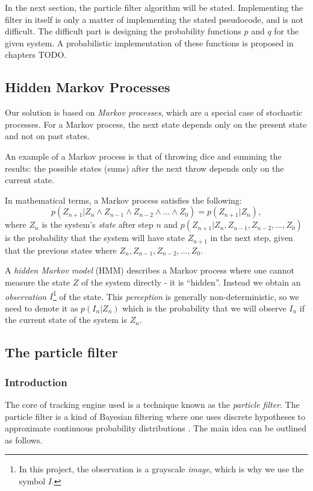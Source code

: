 In the next section, the particle filter algorithm will be stated. Implementing the filter in itself is only a matter of implementing the stated pseudocode, and is not difficult. The difficult part is designing the probability functions $p$ and $q$ for the given system. A probabilistic implementation of these functions is proposed in chapters TODO.


\subsection{Hidden Markov Processes}

Our solution is based on \emph{Markov processes}, which are a special case of stochastic processes. For a Markov process, the next state depends only on the present state and not on past states.

An example of a Markov process is that of throwing dice and summing the results: the possible states (sums) after the next throw depends only on the current state.

In mathematical terms, a Markov process satisfies the following:
\begin{equation}
 p\left(Z_{n+1}|Z_n \wedge Z_{n-1} \wedge Z_{n-2} \wedge \dots \wedge Z_0\right) = p\left(Z_{n+1}|Z_n\right),
\end{equation}
where $Z_n$ is the system's \emph{state} after step $n$ and $p\left(Z_{n+1}|Z_n, Z_{n-1}, Z_{n-2}, \dots, Z_0\right)$ is the probability that the system will have state $Z_{n+1}$ in the next step, given that the previous states where $Z_n, Z_{n-1}, Z_{n-2}, \dots, Z_0$.

A \emph{hidden Markov model} (HMM) describes a Markov process where one cannot measure the state $Z$ of the system directly - it is ``hidden''\cite{EncyclopediaMachineLearning}. Instead we obtain an \emph{observation} $I$\footnote{In this project, the observation is a grayscale \emph{image}, which is why we use the symbol $I$.}  of the state. This \emph{perception} is generally non-deterministic, so we need to denote it as $p(I_n|Z_n)$ which is the probability that we will observe $I_n$ if the current state of the system is $Z_n$.

\subsection{The particle filter}

\subsubsection{Introduction}
The core of tracking engine used is a technique known as the \emph{particle filter}. The particle filter is a kind of Bayesian filtering where one uses discrete hypotheses to approximate continuous probability distributions \cite{ProbRob}. The main idea can be outlined as follows.

